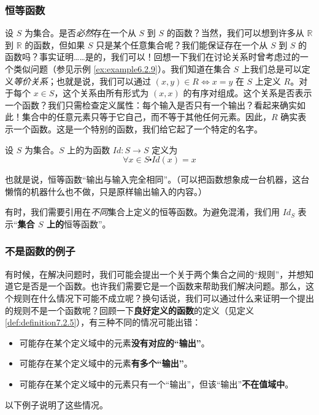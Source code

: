 \subsubsection*{恒等函数}

\begin{example}
    设 $S$ 为集合。是否\emph{必然}存在一个从 $S$ 到 $S$ 的函数？当然，我们可以想到许多从 $\mathbb{R}$ 到 $\mathbb{R}$ 的函数，但如果 $S$ 只是某个任意集合呢？我们能保证存在一个从 $S$ 到 $S$ 的函数吗？事实证明……是的，我们可以！回想一下我们在讨论关系时曾考虑过的一个类似问题（参见示例 \ref{ex:example6.2.9}）。我们知道在集合 $S$ 上我们总是可以定义\emph{等价关系}；也就是说，我们可以通过 $(x, y) \in R \iff x = y$ 在 $S$ 上定义 $R$。对于每个 $x \in S$，这个关系由所有形式为 $(x, x)$ 的有序对组成。这个关系是否表示一个函数？我们只需检查定义属性：每个输入是否只有一个输出？看起来确实如此！集合中的任意元素只等于它自己，而不等于其他任何元素。因此，$R$ 确实表示一个函数。这是一个特别的函数，我们给它起了一个特定的名字。
\end{example}

\begin{definition}
    设 $S$ 为集合。$S$ 上的为函数 $Id : S \to S$ 定义为
    \[\forall x \in S \centerdot Id(x) = x\]
\end{definition}

也就是说，恒等函数``输出与输入完全相同''。（可以把函数想象成一台机器，这台懒惰的机器什么也不做，只是原样输出输入的内容。）

有时，我们需要引用在\emph{不同}集合上定义的恒等函数。为避免混淆，我们用 $Id_S$ 表示``\textbf{集合 $S$ 上的}恒等函数''。

\subsubsection*{不是函数的例子}

有时候，在解决问题时，我们可能会提出一个关于两个集合之间的``规则''，并想知道它是否是一个函数。也许我们需要它是一个函数来帮助我们解决问题。那么，这个规则在什么情况下可能不成立呢？换句话说，我们可以通过什么来证明一个提出的规则不是一个函数呢？回顾一下\textbf{良好定义的函数}的定义（见定义 \ref{def:definition7.2.5}），有三种不同的情况可能出错：

\begin{itemize}
    \item 可能存在某个定义域中的元素\textbf{没有对应的``输出''}。
    \item 可能存在某个定义域中的元素\textbf{有多个``输出''}。
    \item 可能存在某个定义域中的元素只有一个``输出''，但该``输出''\textbf{不在值域中}。
\end{itemize}
以下例子说明了这些情况。\\

